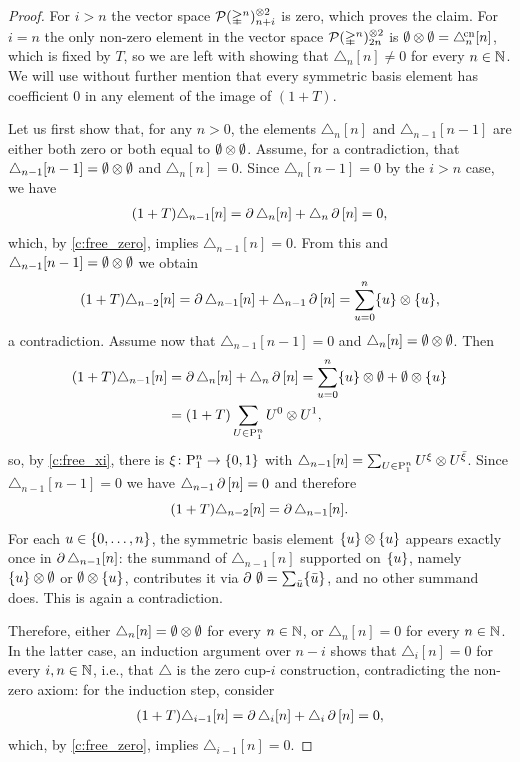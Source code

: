 \begin{proof}
	For $i > n$ the vector space $\mathcal{P}(\mathbb{\Delta}^n)^{\otimes 2}_{n+i}$ is zero, which proves the claim.
	For $i = n$ the only non-zero element in the vector space $\mathcal{P}(\mathbb{\Delta}^n)^{\otimes 2}_{2n}$ is $\emptyset \otimes \emptyset = \triangle^{\!\mathrm{cn}}_n[n]$, which is fixed by $T$, so we are left with showing that $\triangle_n[n] \neq 0$ for every $n \in \mathbb{N}$.
	We will use without further mention that every symmetric basis element has coefficient $0$ in any element of the image of $(1+T)$.

	Let us first show that, for any $n > 0$, the elements $\triangle_n[n]$ and $\triangle_{n-1}[n-1]$ are either both zero or both equal to $\emptyset \otimes \emptyset$.
	Assume, for a contradiction, that $\triangle_{n-1}[n-1] = \emptyset \otimes \emptyset$ and $\triangle_n[n] = 0$.
	Since $\triangle_n[n-1] = 0$ by the $i > n$ case, we have
	\begin{align*}
	(1+T) \triangle_{n-1} [n] =
	\operatorname{\partial} \triangle_{n} [n] + \triangle_{n} \operatorname{\partial} \, [n] = 0,
	\end{align*}
	which, by \cref{c:free_zero}, implies $\triangle_{n-1}[n] = 0$.
	From this and $\triangle_{n-1}[n-1] = \emptyset \otimes \emptyset$ we obtain
	\[
	(1+T)\triangle_{n-2}[n] =
	\operatorname{\partial} \triangle_{n-1}[n] + \triangle_{n-1} \operatorname{\partial} \, [n] =
	\sum_{u = 0}^{n} \{u\} \otimes \{u\},
	\]
	a contradiction.
	Assume now that $\triangle_{n-1}[n-1] = 0$ and $\triangle_n[n] = \emptyset \otimes \emptyset$.
	Then
	\begin{align*}
		(1+T) \triangle_{n-1} [n] &=
		\operatorname{\partial} \triangle_{n} [n] + \triangle_{n} \operatorname{\partial} \, [n] =
		\sum_{u=0}^n \{u\} \otimes \emptyset + \emptyset \otimes \{u\} \\ &=
		(1+T)\sum_{U \in \mathrm{P}_1^n} U^0 \otimes U^1,
	\end{align*}
	so, by \cref{c:free_xi}, there is $\xi \colon \mathrm{P}_1^n \to \{0,1\}$ with $\triangle_{n-1}[n] = \sum_{U \in \mathrm{P}_1^n} U^\xi \otimes U^{\bar{\xi}}$.
	Since $\triangle_{n-1}[n-1] = 0$ we have $\triangle_{n-1}\operatorname{\partial}\,[n] = 0$ and therefore
	\[
	(1+T)\triangle_{n-2}[n] = \operatorname{\partial} \triangle_{n-1}[n].
	\]
	For each $u \in \{0, \dots, n\}$, the symmetric basis element $\{u\} \otimes \{u\}$ appears exactly once in $\operatorname{\partial} \triangle_{n-1}[n]$: the summand of $\triangle_{n-1}[n]$ supported on $\{u\}$, namely $\{u\} \otimes \emptyset$ or $\emptyset \otimes \{u\}$, contributes it via $\operatorname{\partial}\, \emptyset = \sum_{\bar u} \{\bar u\}$, and no other summand does.
	This is again a contradiction.

	Therefore, either $\triangle_n[n] = \emptyset \otimes \emptyset$ for every $n \in \mathbb{N}$, or $\triangle_n[n] = 0$ for every $n \in \mathbb{N}$.
	In the latter case, an induction argument over $n-i$ shows that $\triangle_i [n] = 0$ for every $i, n \in \mathbb{N}$, i.e., that $\triangle$ is the zero \mbox{cup-$i$} construction, contradicting the non-zero axiom:
	for the induction step, consider
	\begin{align*}
	(1+T) \triangle_{i-1} [n] =
	\operatorname{\partial} \triangle_{i} [n] + \triangle_{i} \operatorname{\partial}\, [n] = 0,
	\end{align*}
	which, by \cref{c:free_zero}, implies $\triangle_{i-1} [n] = 0$.
\end{proof}

